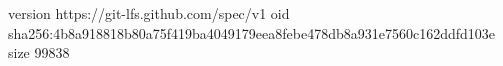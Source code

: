version https://git-lfs.github.com/spec/v1
oid sha256:4b8a918818b80a75f419ba4049179eea8febe478db8a931e7560c162ddfd103e
size 99838
